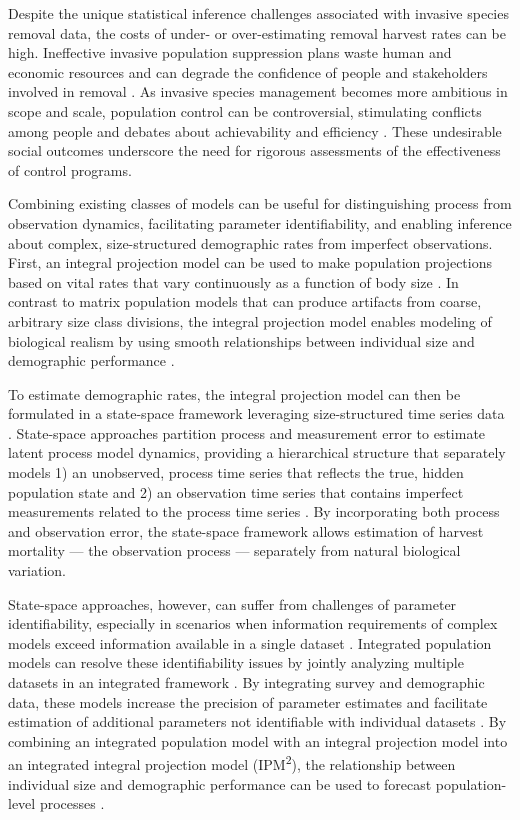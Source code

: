 \documentclass{article}
\begin{document}
Despite the unique statistical inference challenges associated with invasive species removal data, the costs of under- or over-estimating removal harvest rates can be high. Ineffective invasive population suppression plans waste human and economic resources and can degrade the confidence of people and stakeholders involved in removal \parencite{tiberti2021alien}. As invasive species management becomes more ambitious in scope and scale, population control can be controversial, stimulating conflicts among people and debates about achievability and efficiency \parencite{crowley2017conflict}. These undesirable social outcomes underscore the need for rigorous assessments of the effectiveness of control programs.

Combining existing classes of models can be useful for distinguishing process from observation dynamics, facilitating parameter identifiability, and enabling inference about complex, size-structured demographic rates from imperfect observations. First, an integral projection model can be used to make population projections based on vital rates that vary continuously as a function of body size \parencite{merow2014advancing, rees2014building}. In contrast to matrix population models that can produce artifacts from coarse, arbitrary size class divisions, the integral projection model enables modeling of biological realism by using smooth relationships between individual size and demographic performance \parencite{ellner2006integral}. 

To estimate demographic rates, the integral projection model can then be formulated in a state-space framework leveraging size-structured time series data \parencite{white2016fitting}. State-space approaches partition process and measurement error to estimate latent process model dynamics, providing a hierarchical structure that separately models 1) an unobserved, process time series that reflects the true, hidden population state and 2) an observation time series that contains imperfect measurements related to the process time series \parencite{auger2021guide, newman2006hidden}. By incorporating both process and observation error, the state-space framework allows estimation of harvest mortality — the observation process — separately from natural biological variation.

State-space approaches, however, can suffer from challenges of parameter identifiability, especially in scenarios when information requirements of complex models exceed information available in a single dataset \parencite{auger2016state, knape2008estimability}. Integrated population models can resolve these identifiability issues by jointly analyzing multiple datasets in an integrated framework \parencite{besbeas2002integrating}. By integrating survey and demographic data, these models increase the precision of parameter estimates and facilitate estimation of additional parameters not identifiable with individual datasets \parencite{riecke2019integrated, abadi2010assessment}. By combining an integrated population model with an integral projection model into an integrated integral projection model (IPM\textsuperscript{2}), the relationship between individual size and demographic performance can be used to forecast population-level processes \parencite{plard2019ipm}.
\end{document}
